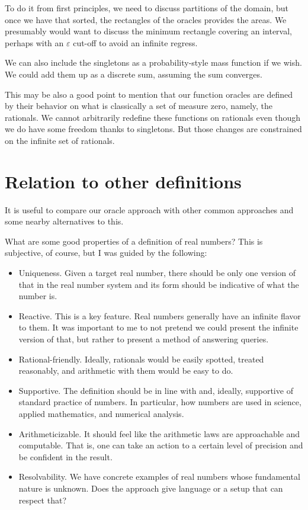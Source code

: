 \documentclass[12pt]{article}
\theoremstyle{remark}
\begin{document}
To do it from first principles, we need to discuss partitions of the domain, but once we have that sorted, the rectangles of the oracles provides the areas. We presumably would want to discuss the minimum rectangle covering an interval, perhaps with an $\varepsilon$ cut-off to avoid an infinite regress. 

We can also include the singletons as a probability-style mass function if we wish. We could add them up as a discrete sum, assuming the sum converges. 

This may be also a good point to mention that our function oracles are defined by their behavior on what is classically a set of measure zero, namely, the rationals. We cannot arbitrarily redefine these functions on rationals even though we do have some freedom thanks to singletons. But those changes are constrained on the infinite set of rationals. 

\section{Relation to other definitions}

It is useful to compare our oracle approach with other common approaches and some nearby alternatives to this. 

What are some good properties of a definition of real numbers? This is subjective, of course, but I was guided by the following: 

\begin{itemize}
    \item Uniqueness. Given a target real number, there should be only one version of that in the real number system and its form should be indicative of what the number is. 
    \item Reactive. This is a key feature. Real numbers generally have an infinite flavor to them. It was important to me to not pretend we could present the infinite version of that, but rather to present a method of answering queries. 
    \item Rational-friendly. Ideally, rationals would be easily spotted, treated reasonably, and arithmetic with them would be easy to do. 
    \item Supportive. The definition should be in line with and, ideally, supportive of standard practice of numbers. In particular, how numbers are used in science, applied mathematics, and numerical analysis. 
    \item Arithmeticizable. It should feel like the arithmetic laws are approachable and computable. That is, one can take an action to a certain level of precision and be confident in the result.
    \item Resolvability. We have concrete examples of real numbers whose fundamental nature is unknown. Does the approach give language or a setup that can respect that? 
\end{itemize}
\end{document}
